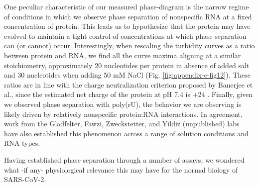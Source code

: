 \documentclass[../main.tex]{subfiles}
\begin{document}
        One peculiar characteristic of our measured phase-diagram is the narrow regime of conditions in which we observe phase separation of nonspecific RNA at a fixed concentration of protein. This leads us to hypothesize that the protein may have evolved to maintain a tight control of concentrations at which phase separation can (or cannot) occur. Interestingly, when rescaling the turbidity curves as a ratio between protein and RNA, we find all the curve maxima aligning at a similar stoichiometry, approximately 20 nucleotides per protein in absence of added salt and 30 nucleotides when adding 50 mM NaCl (Fig. \ref{fig:appendix-e-fig12}). These ratios are in line with the charge neutralization criterion proposed by Banerjee et al., since the estimated net charge of the protein at pH 7.4 is +24 \cite{Banerjee2017-jv}. Finally, given we observed phase separation with poly(rU), the behavior we are observing is likely driven by relatively nonspecific protein:RNA interactions. In agreement, work from the Gladfelter\cite{Iserman2020-xm}, Fawzi\cite{Perdikari2020-cx}, Zweckstetter\cite{Savastano2020-zf}, and Yildiz (unpublished) labs have also established this phenomenon across a range of solution conditions and RNA types.

        Having established phase separation through a number of assays, we wondered what -if any- physiological relevance this may have for the normal biology of SARS-CoV-2.
\end{document}
